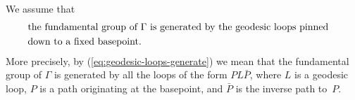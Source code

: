 \documentclass[letterpaper]{amsart}
\numberwithin{equation}{section}
\theoremstyle{definition}
\def\PP{\mathbb{P}}
\newcommand{\overunder}[2]{ 
\!\begin{array}{c} 
\scriptstyle{#1}\\[-.1in] 
-\!\!\!-\!\!\!-\\[-.1in] 
\scriptstyle{#2} 
\end{array} 
\! 
}
\newcommand{\labeledarrow}[2]{ 
\!\overunder{\scriptstyle{\ #1\ \ \ #2}}{} 
}
\begin{document}
% 
We assume that %
\begin{align} 
\label{eq:geodesic-loops-generate} 
&\text{the fundamental group of $\Gamma$ is generated by the 
geodesic loops pinned\quad}\\ 
\nonumber 
&\text{down to a fixed basepoint.} 
\end{align} 
More precisely, by (\ref{eq:geodesic-loops-generate}) we mean that the 
fundamental group of $\Gamma$ is generated by all the 
loops of the form $PL\bar P$, where $L$ is a geodesic loop, 
$P$ is a path originating at the basepoint, 
and $\bar P$ is the inverse path to~$P$. 
 
\end{document}

